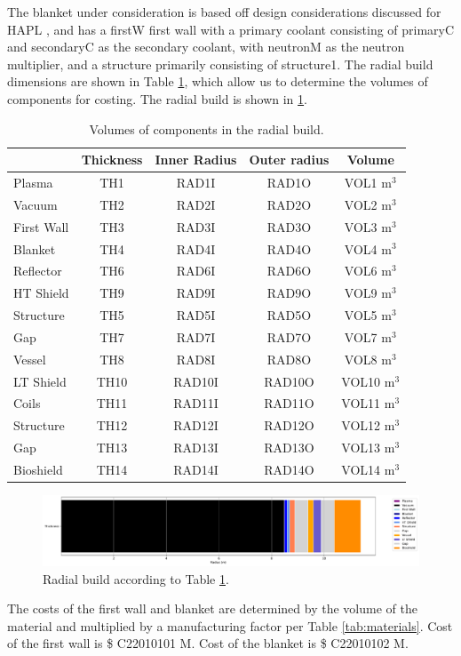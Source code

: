 The blanket under consideration is based off design considerations discussed for HAPL \cite{Raffray2006}, and has a firstW first wall with a primary coolant consisting of primaryC and secondaryC as the secondary coolant, with neutronM as the neutron multiplier, and a structure primarily consisting of structure1. The radial build dimensions are shown in Table \ref{tab:volumes}, which allow us to determine the volumes of components for costing.  The radial build is shown in \ref{fig:radial}.  \\


\begin{table}[h!]
    \centering
    \begin{tabular}{l c  c c c}
    \hline
        &	Thickness	&	Inner Radius	&	Outer radius	&	Volume		\\
        \hline
Plasma	&	TH1	&	RAD1I	&	RAD1O	&	VOL1	m$^{3}$	\\
Vacuum	&	TH2	&	RAD2I	&	RAD2O	&	VOL2	m$^{3}$	\\
First Wall	&	TH3	&	RAD3I	&	RAD3O	&	VOL3	m$^{3}$	\\
Blanket	&	TH4	&	RAD4I	&	RAD4O	&	VOL4	m$^{3}$	\\
Reflector	&	TH6	&	RAD6I	&	RAD6O	&	VOL6	m$^{3}$	\\
HT Shield	&	TH9	&	RAD9I	&	RAD9O	&	VOL9	m$^{3}$	\\
Structure	&	TH5	&	RAD5I	&	RAD5O	&	VOL5	m$^{3}$	\\
Gap	&	TH7	&	RAD7I	&	RAD7O	&	VOL7	m$^{3}$	\\
Vessel	&	TH8	&	RAD8I	&	RAD8O	&	VOL8	m$^{3}$	\\
LT Shield	&	TH10	&	RAD10I	&	RAD10O	&	VOL10	m$^{3}$	\\
Coils	&	TH11	&	RAD11I	&	RAD11O	&	VOL11	m$^{3}$	\\
Structure	&	TH12	&	RAD12I	&	RAD12O	&	VOL12	m$^{3}$	\\
Gap	&	TH13	&	RAD13I	&	RAD13O	&	VOL13	m$^{3}$	\\
Bioshield	&	TH14	&	RAD14I	&	RAD14O	&	VOL14	m$^{3}$	\\

        \hline
    \end{tabular}
    \caption{Volumes of components in the radial build.}
    \label{tab:volumes}
\end{table}

\begin{figure}
    \centering
    \includegraphics[width=0.9\linewidth]{Figures/radial_build.pdf}
    \caption{Radial build according to Table \ref{tab:volumes}.}
    \label{fig:radial}
\end{figure}



The costs of the first wall and blanket are determined by the volume of the material and multiplied by a manufacturing factor per Table \ref{tab:materials}.   Cost of the first wall is \$ C22010101 M.  Cost of the blanket is \$ C22010102 M.

